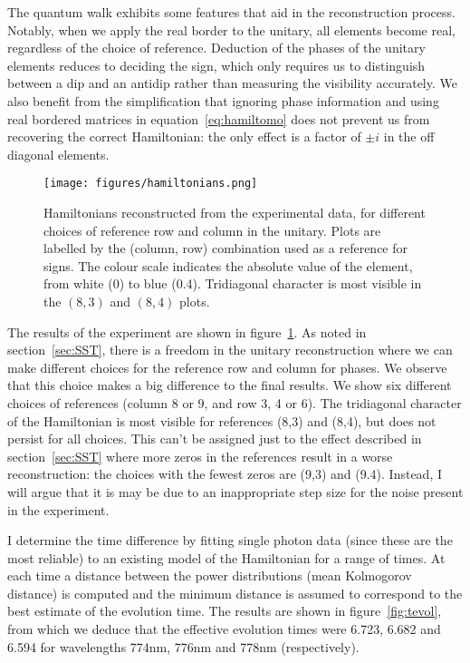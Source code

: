 The quantum walk exhibits some features that aid in the reconstruction process.
Notably, when we apply the real border to the unitary, all elements become real,
regardless of the choice of reference. Deduction of the phases of the unitary
elements reduces to deciding the sign, which only requires us to distinguish
between a dip and an antidip rather than measuring the visibility accurately. We
also benefit from the simplification that ignoring phase information and using
real bordered matrices in equation~\ref{eq:hamiltomo} does not prevent us from
recovering the correct Hamiltonian: the only effect is a factor of \(\pm i\) in
the off diagonal elements.

\begin{figure}
  \centering
  \texttt{[image: figures/hamiltonians.png]}
  \caption[Reconstructed Hamiltonians]
  {Hamiltonians reconstructed from the experimental data, for different choices
  of reference row and column in the unitary. Plots are labelled by the (column,
  row) combination used as a reference for signs. The colour scale indicates the
  absolute value of the element, from white (0) to blue (0.4). Tridiagonal
  character is most visible in the \(\left(8,3\right)\) and \(\left(8,4\right)\)
  plots.}
  \label{fig:hamiltonians}
\end{figure}

The results of the experiment are shown in figure~\ref{fig:hamiltonians}.
As noted in section~\ref{sec:SST}, there is a freedom in the unitary
reconstruction where we can make different choices for the reference row and
column for phases. We observe that this choice makes a big difference to the
final results. We show six
different choices of references (column 8 or 9, and row 3, 4 or 6). The
tridiagonal character of the Hamiltonian is most visible for references (8,3)
and (8,4), but does not persist for all choices. This can't be assigned just to
the effect described in section~\ref{sec:SST} where more zeros in the references
result in a worse reconstruction: the choices with the fewest zeros are (9,3)
and (9.4). Instead, I will argue that it is may be due to an inappropriate step
size for the noise present in the experiment.

I determine the time difference by fitting single photon data (since these are
the most reliable) to an existing model of the Hamiltonian  for a range of times. At each time a distance between the power
distributions (mean Kolmogorov distance) is computed and the minimum distance is
assumed to correspond to the best estimate of the evolution time. The results
are shown in figure~\ref{fig:tevol}, from which we deduce that the effective
evolution times were 6.723, 6.682 and 6.594 for wavelengths 774nm, 776nm and
778nm (respectively).

